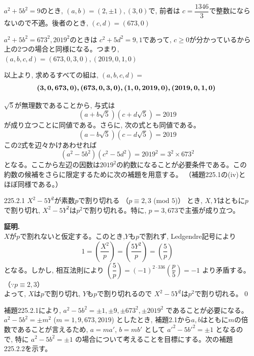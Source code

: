$a^2+5b^2=9$のとき, $(a,b)=(2,\pm 1), (3,0)$で, 前者は $c=\dfrac{1346}{3}$で整数にならないので不適。後者のとき, $(c,d)=(673, 0)$

$a^2+5b^2=673^2, 2019^2$のときは $c^2+5d^2=9,1$であって, $c\geq 0$が分かっているから上の2つの場合と同様になる。つまり, $(a,b,c,d)=(673,0,3,0), (2019,0,1,0)$

以上より, 求めるすべての組は, $(a,b,c,d)=$
\[\mbox{{\boldmath  $(3,0,673,0),(673,0,3,0),(1,0,2019,0),(2019,0,1,0)$} }\]

$\sqrt{5}$が無理数であることから, 与式は
\[(a+b\sqrt{5})(c+d\sqrt{5})=2019\]
が成り立つことに同値である。さらに, 次の式とも同値である。
\[(a-b\sqrt{5})(c-d\sqrt{5})=2019\]
この2式を辺々かけあわせれば
\[(a^2-5b^2)(c^2-5d^2)=2019^2=3^2\times 673^2\]
となる。ここから左辺の因数は$2019^2$の約数になることが必要条件である。この約数の候補をさらに限定するために次の補題を用意する。 （補題225.1の(iv)とほぼ同様である。）

\begin{subthm}{225.2.1}
 $X^2-5Y^2$が素数$p$で割り切れる （$p\equiv 2,3$ (mod $5$)） とき, $X,Y$はともに$p$で割り切れ, $X^2-5Y^2$は$p^2$で割り切れる。特に, $p=3,673$で主張が成り立つ。
\end{subthm}

{\bf 証明.}\\
$X$が$p$で割れないと仮定する。このとき,$Y$も$p$で割れず, Ledgendre記号により
\[1=\left(\dfrac{X^2}{p}\right)=\left(\dfrac{5Y^2}{p}\right)=\left(\dfrac{5}{p}\right)\]
となる。しかし, 相互法則により $\left(\dfrac{5}{p}\right)=(-1)^{2\cdot 336}\left(\dfrac{p}{5}\right)=-1$ より矛盾する。（$\because p\equiv 2,3$）\\
よって, $X$は$p$で割り切れ, $Y$も$p$で割り切れるので $X^2-5Y^2$は$p^2$で割り切れる。\qed

補題225.2.1により, $a^2-5b^2=\pm 1, \pm 9, \pm 673^2, \pm 2019^2$ であることが必要になる。$a^2-5b^2=\pm m^2$ ($m=1,9,673,2019$) としたとき, 補題2.1から$a,b$はともに$m$の倍数であることが言えるため, $a=ma'$, $b=mb'$ として $a'^2-5b'^2=\pm 1$ となるので, 特に $a^2-5b^2=\pm 1$ の場合について考えることを目標にする。次の補題225.2.2を示す。

